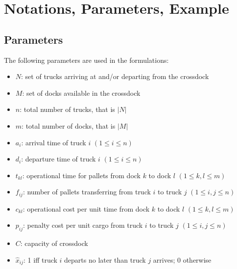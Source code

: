 \documentclass[preprint,12pt,authoryear]{elsarticle}
\begin{document}
\section{Notations, Parameters, Example} 
\label{sec:Notations}


%
%

\subsection{Parameters}
\medskip

\noindent
The following parameters are used in the formulations: 
\begin{itemize}
    \item []$N$: \hspace{1.5mm}set of trucks arriving at and/or departing from the crossdock
    \item []$M$: \hspace{1.1mm}set of docks available in the crossdock
    \item []$n$: \hspace{2.5mm}total number of trucks, that is $|N|$ %
    \item []$m$: \hspace{1.5mm}total number of docks, that is $|M|$ 
    \item []$a_i$: \hspace{1.5mm}arrival time of truck $i$ \hfill$(1 \leq i \leq n)$
    \item []$d_i$: \hspace{1.5mm}departure time of truck $i$ \hfill$(1 \leq i \leq n)$
    \item []$t_{kl}$: \hspace{1mm}operational time for pallets from dock $k$ to dock $l$ \hfill $(1 \leq k,l \leq m)$
    \item []$f_{ij}$: \hspace{1mm}number of pallets transferring from truck $i$ to truck $j$ \hfill$(1 \leq i,j \leq n)$
    \item []$c_{kl}$: \hspace{1mm}operational cost per unit time from dock $k$ to dock $l$ \hfill$(1 \leq k,l \leq m)$
    \item []$p_{ij}$: \hspace{1mm}penalty cost per unit cargo from truck $i$ to truck $j$ \hfill$(1 \leq i,j \leq n)$
    \item []$C$: \hspace{2mm}capacity of crossdock
    \item []$\hat{x}_{ij}$: \hspace{0.5mm}1 iff truck $i$ departs no later than truck $j$ arrives; 0 otherwise
\end{itemize}
\medskip
\end{document}
